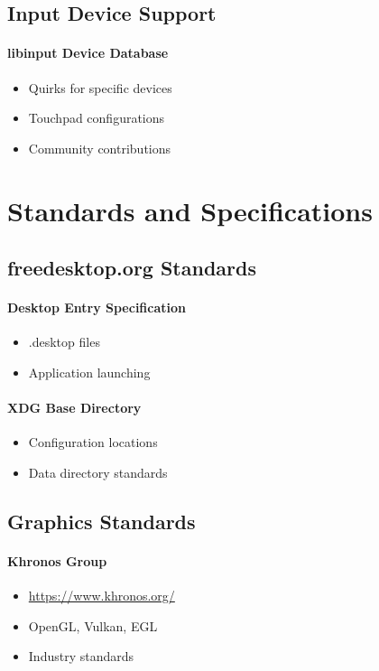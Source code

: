 \subsection{Input Device Support}

\paragraph{libinput Device Database}
\begin{itemize}
    \item Quirks for specific devices
    \item Touchpad configurations
    \item Community contributions
\end{itemize}

\section{Standards and Specifications}

\subsection{freedesktop.org Standards}

\paragraph{Desktop Entry Specification}
\begin{itemize}
    \item .desktop files
    \item Application launching
\end{itemize}

\paragraph{XDG Base Directory}
\begin{itemize}
    \item Configuration locations
    \item Data directory standards
\end{itemize}

\subsection{Graphics Standards}

\paragraph{Khronos Group}
\begin{itemize}
    \item \url{https://www.khronos.org/}
    \item OpenGL, Vulkan, EGL
    \item Industry standards
\end{itemize}

